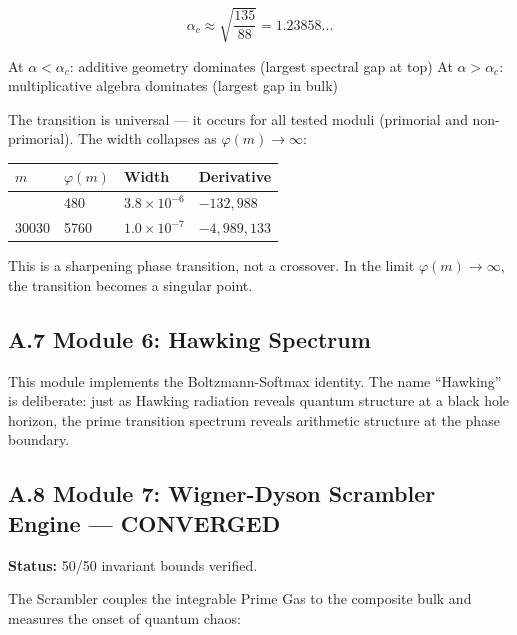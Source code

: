 \documentclass[
  11pt,
]{article}
\newcounter{none} %
\numberwithin{equation}{section}
\begin{document}
\begin{equation}\alpha_c \approx \sqrt{\frac{135}{88}} = 1.23858...\end{equation}

At \(\alpha < \alpha_c\): additive geometry dominates (largest spectral
gap at top) At \(\alpha > \alpha_c\): multiplicative algebra dominates
(largest gap in bulk)

The transition is universal --- it occurs for all tested moduli
(primorial and non-primorial). The width collapses as
\(\varphi(m) \to \infty\):

{\def\LTcaptype{none} %
\begin{longtable}[]{@{}llll@{}}
\toprule\noalign{}
\(m\) & \(\varphi(m)\) & Width & Derivative \\
\midrule\noalign{}
\endhead
\bottomrule\noalign{}
\endlastfoot
2310 & 480 & \(3.8 \times 10^{-6}\) & \(-132,988\) \\
30030 & 5760 & \(1.0 \times 10^{-7}\) & \(-4,989,133\) \\
\end{longtable}
}

This is a sharpening phase transition, not a crossover. In the limit
\(\varphi(m) \to \infty\), the transition becomes a singular point.

\subsection{A.7 Module 6: Hawking
Spectrum}\label{a.7-module-6-hawking-spectrum}

This module implements the Boltzmann-Softmax identity. The name
``Hawking'' is deliberate: just as Hawking radiation reveals quantum
structure at a black hole horizon, the prime transition spectrum reveals
arithmetic structure at the phase boundary.

\subsection{\texorpdfstring{A.8 Module 7: Wigner-Dyson Scrambler
Engine ---
\textbf{CONVERGED}}{A.8 Module 7: Wigner-Dyson Scrambler Engine --- CONVERGED}}\label{a.8-module-7-wigner-dyson-scrambler-engine-converged}

\textbf{Status:} 50/50 invariant bounds verified.

The Scrambler couples the integrable Prime Gas to the composite bulk and
measures the onset of quantum chaos:
\end{document}
